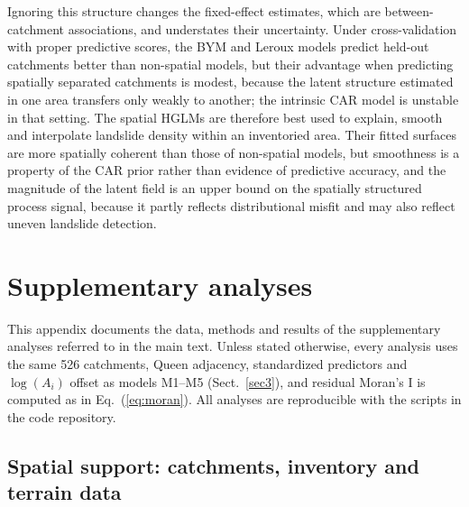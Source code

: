 \documentclass[journal abbreviation, manuscript]{copernicus}
\newcommand{\hlE}[1]{#1}
\begin{document}
\hlE{Ignoring this structure changes the fixed-effect estimates, which are between-catchment associations, and understates their uncertainty. Under cross-validation with proper predictive scores, the BYM and Leroux models predict held-out catchments better than non-spatial models, but their advantage when predicting spatially separated catchments is modest, because the latent structure estimated in one area transfers only weakly to another; the intrinsic CAR model is unstable in that setting. The spatial HGLMs are therefore best used to explain, smooth and interpolate landslide density within an inventoried area. Their fitted surfaces are more spatially coherent than those of non-spatial models, but smoothness is a property of the CAR prior rather than evidence of predictive accuracy, and the magnitude of the latent field is an upper bound on the spatially structured process signal, because it partly reflects distributional misfit and may also reflect uneven landslide detection.}


\appendix
\section{\hlE{Supplementary analyses}}\label{secA}
\appendixfigures
\appendixtables

This appendix documents the data, methods and results of the supplementary analyses referred to in the main text. Unless stated otherwise, every analysis uses the same 526 catchments, Queen adjacency, standardized predictors and $\log(A_i)$ offset as models M1--M5 (Sect.~\ref{sec3}), and residual Moran's I is computed as in Eq.~(\ref{eq:moran}). All analyses are reproducible with the scripts in the code repository.

\subsection{Spatial support: catchments, inventory and terrain data}\label{secA1}
\end{document}
